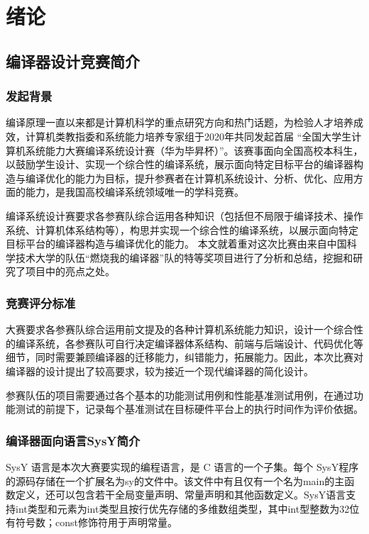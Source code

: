
\chapter{绪论}

\section{编译器设计竞赛简介}

\subsection{发起背景}

编译原理一直以来都是计算机科学的重点研究方向和热门话题，为检验人才培养成效，计算机类教指委和系统能力培养专家组于2020年共同发起首届 “全国大学生计算机系统能力大赛编译系统设计赛（华为毕昇杯）”。该赛事面向全国高校本科生，以鼓励学生设计、实现一个综合性的编译系统，展示面向特定目标平台的编译器构造与编译优化的能力为目标，提升参赛者在计算机系统设计、分析、优化、应用方面的能力，是我国高校编译系统领域唯一的学科竞赛。

编译系统设计赛要求各参赛队综合运用各种知识（包括但不局限于编译技术、操作系统、计算机体系结构等），构思并实现一个综合性的编译系统，以展示面向特定目标平台的编译器构造与编译优化的能力。
本文就着重对这次比赛由来自中国科学技术大学的队伍“燃烧我的编译器”队的特等奖项目进行了分析和总结，挖掘和研究了项目中的亮点之处。

\subsection{竞赛评分标准}

大赛要求各参赛队综合运用前文提及的各种计算机系统能力知识，设计一个综合性的编译系统，各参赛队可自行决定编译器体系结构、前端与后端设计、代码优化等细节，同时需要兼顾编译器的迁移能力，纠错能力，拓展能力。因此，本次比赛对编译器的设计提出了较高要求，较为接近一个现代编译器的简化设计。

参赛队伍的项目需要通过各个基本的功能测试用例和性能基准测试用例，在通过功能测试的前提下，记录每个基准测试在目标硬件平台上的执行时间作为评价依据。

\subsection{编译器面向语言SysY简介}

SysY 语言是本次大赛要实现的编程语言，是 C 语言的一个子集。每个 SysY程序的源码存储在一个扩展名为sy的文件中。该文件中有且仅有一个名为main的主函数定义，还可以包含若干全局变量声明、常量声明和其他函数定义。SysY语言支持int类型和元素为int类型且按行优先存储的多维数组类型，其中int型整数为32位有符号数；const修饰符用于声明常量。

